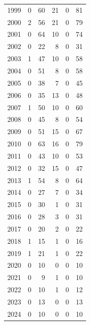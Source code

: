 \documentclass[
]{scrartcl}
\begin{document}
\begin{longtable}{rrrrrr}
1999 & 0 & 60 & 21 & 0 & 81 \\ 
2000 & 2 & 56 & 21 & 0 & 79 \\ 
2001 & 0 & 64 & 10 & 0 & 74 \\ 
2002 & 0 & 22 & 8 & 0 & 31 \\ 
2003 & 1 & 47 & 10 & 0 & 58 \\ 
2004 & 0 & 51 & 8 & 0 & 58 \\ 
2005 & 0 & 38 & 7 & 0 & 45 \\ 
2006 & 0 & 35 & 13 & 0 & 48 \\ 
2007 & 1 & 50 & 10 & 0 & 60 \\ 
2008 & 0 & 45 & 8 & 0 & 54 \\ 
2009 & 0 & 51 & 15 & 0 & 67 \\ 
2010 & 0 & 63 & 16 & 0 & 79 \\ 
2011 & 0 & 43 & 10 & 0 & 53 \\ 
2012 & 0 & 32 & 15 & 0 & 47 \\ 
2013 & 1 & 54 & 8 & 0 & 64 \\ 
2014 & 0 & 27 & 7 & 0 & 34 \\ 
2015 & 0 & 30 & 1 & 0 & 31 \\ 
2016 & 0 & 28 & 3 & 0 & 31 \\ 
2017 & 0 & 20 & 2 & 0 & 22 \\ 
2018 & 1 & 15 & 1 & 0 & 16 \\ 
2019 & 1 & 21 & 1 & 0 & 22 \\ 
2020 & 0 & 10 & 0 & 0 & 10 \\ 
2021 & 0 & 9 & 1 & 0 & 10 \\ 
2022 & 0 & 10 & 1 & 0 & 12 \\ 
2023 & 0 & 13 & 0 & 0 & 13 \\ 
2024 & 0 & 10 & 0 & 0 & 10 \\ 
\bottomrule

\end{longtable}

\endgroup

\newpage{}

\begingroup
\fontsize{9.0pt}{10.8pt}\selectfont
\end{document}
